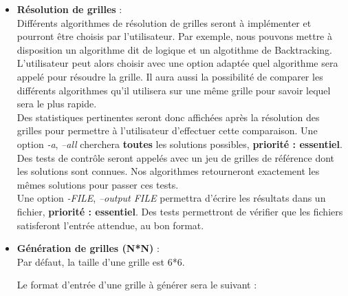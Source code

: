 \documentclass[1]{report}
\begin{document}
        \begin{itemize}

            \item \textbf{Résolution de grilles} : \\

        \quad Différents algorithmes de résolution de grilles seront à implémenter et pourront être choisis par l'utilisateur. Par exemple, nous pouvons mettre à disposition un algorithme dit de logique et un algotithme de Backtracking.
        \\

     \quad L'utilisateur peut alors choisir avec une option adaptée quel algorithme sera appelé pour résoudre la grille. Il aura aussi la possibilité de comparer les différents algorithmes qu'il utilisera sur une même grille pour savoir lequel sera le plus rapide.
\\

		\quad	Des statistiques pertinentes seront donc affichées après la résolution des grilles pour permettre à l'utilisateur d'effectuer cette comparaison.	Une option \emph{-a}, \emph{--all} cherchera \textbf{toutes} les solutions possibles, \textbf{priorité : essentiel}.
\\

        \quad    Des tests de contrôle seront appelés avec un jeu de grilles de référence dont les solutions sont connues. Nos algorithmes retourneront exactement les mêmes solutions pour passer ces tests.
\\

        \quad    Une option \emph{-FILE}, \emph{--output FILE} permettra d'écrire les résultats dans un fichier, \textbf{priorité : essentiel}. Des tests permettront de vérifier que les fichiers satisferont l'entrée attendue, au bon format.



            \item \textbf{Génération de grilles (N*N)} : \\

            Par défaut, la taille d'une grille est 6*6.

            Le format d'entrée d'une grille à générer sera le suivant : \\

            \begin{center}


\end{center}
\end{itemize}
\end{document}
